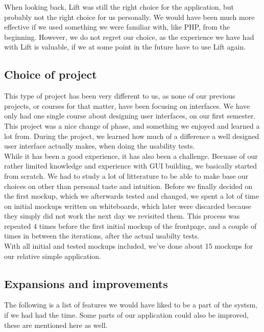 When looking back, Lift was still the right choice for the application, but probably not the right choice for us personally. We would have been much more effective if we used something we were familiar with, like PHP, from the beginning. However, we do not regret our choice, as the experience we have had with Lift is valuable, if we at some point in the future have to use Lift again.

\subsection{Choice of project}
This type of project has been very different to us, as none of our previous projects, or courses for that matter, have been focusing on interfaces. We have only had one single course about designing user interfaces, on our first semester. \\
This project was a nice change of phase, and something we enjoyed and learned a lot from. During the project, we learned how much of a difference a well designed user interface actually makes, when doing the usability tests.\\
While it has been a good experience, it has also been a challenge. Becuase of our rather limited knowledge and experience with GUI building, we basically started from scratch. We had to study a lot of litterature to be able to make base our choices on other than personal taste and intuition. Before we finally decided on the first mockup, which we afterwards tested and changed, we spent a lot of time on initial mockups written on whiteboards, which later were discarded because they simply did not work the next day we revisited them. This process was repeated 4 times before the first initial mockup of the frontpage, and a couple of times in between the iterations, after the actual usabilty tests.\\ With all initial and tested mockups included, we've done about 15 mockups for our relative simple application.

\subsection{Expansions and improvements}
The following is a list of features we would have liked to be a part of the systsm, if we had had the time. Some parts of our application could also be improved, these are mentioned here as well.

